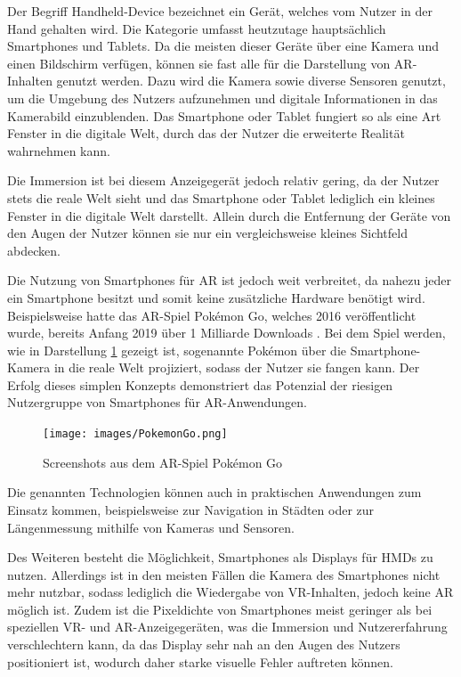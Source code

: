   Der Begriff \glqq{}Handheld-Device\grqq{} bezeichnet ein Gerät, welches vom Nutzer in der Hand gehalten wird.
  Die Kategorie umfasst heutzutage hauptsächlich Smartphones und Tablets.
  Da die meisten dieser Geräte über eine Kamera und einen Bildschirm verfügen, können sie fast alle für die Darstellung von AR-Inhalten genutzt werden.
  Dazu wird die Kamera sowie diverse Sensoren genutzt, um die Umgebung des Nutzers aufzunehmen und digitale Informationen in das Kamerabild einzublenden.
  Das Smartphone oder Tablet fungiert so als eine Art Fenster in die digitale Welt, durch das der Nutzer die erweiterte Realität wahrnehmen kann.

  Die Immersion ist bei diesem Anzeigegerät jedoch relativ gering, da der Nutzer stets die reale Welt sieht und das Smartphone oder Tablet lediglich ein kleines Fenster in die digitale Welt darstellt.
  Allein durch die Entfernung der Geräte von den Augen der Nutzer können sie nur ein vergleichsweise kleines Sichtfeld abdecken.

  Die Nutzung von Smartphones für AR ist jedoch weit verbreitet, da nahezu jeder ein Smartphone besitzt und somit keine zusätzliche Hardware benötigt wird.
  Beispielsweise hatte das AR-Spiel Pok\'emon Go, welches 2016 veröffentlicht wurde, bereits Anfang 2019 über 1 Milliarde Downloads \autocite[][]{pokemon-go-stats}.
  Bei dem Spiel werden, wie in Darstellung \ref*{fig:pokemon-go} gezeigt ist, sogenannte Pok\'emon über die Smartphone-Kamera in die reale Welt projiziert, sodass der Nutzer sie fangen kann.
  Der Erfolg dieses simplen Konzepts demonstriert das Potenzial der riesigen Nutzergruppe von Smartphones für AR-Anwendungen.


  \begin{figure}[H]
    \centering
    \texttt{[image: images/PokemonGo.png]}
    \caption{Screenshots aus dem AR-Spiel Pok\'emon Go}
    \label{fig:pokemon-go}
  \end{figure}

  Die genannten Technologien können auch in praktischen Anwendungen zum Einsatz kommen, beispielsweise zur Navigation in Städten oder zur Längenmessung mithilfe von Kameras und Sensoren.

  Des Weiteren besteht die Möglichkeit, Smartphones als Displays für HMDs zu nutzen.
  Allerdings ist in den meisten Fällen die Kamera des Smartphones nicht mehr nutzbar, sodass lediglich die Wiedergabe von VR-Inhalten, jedoch keine AR möglich ist.
  Zudem ist die Pixeldichte von Smartphones meist geringer als bei speziellen VR- und AR-Anzeigegeräten, was die Immersion und Nutzererfahrung verschlechtern kann, da das Display sehr nah an den Augen des Nutzers positioniert ist, wodurch daher starke visuelle Fehler auftreten können.

